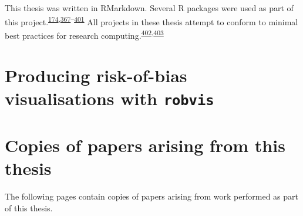 \documentclass[a4paper, twoside]{templates/ociamthesis}
\newcommand*{\bibtitle}{Bibliography}
\begin{document}
This thesis was written in RMarkdown. Several R packages were used as part of this project.\textsuperscript{\protect\hyperlink{ref-R-metafor}{174},\protect\hyperlink{ref-R-base}{367}--\protect\hyperlink{ref-sylly2018}{401}}
All projects in these thesis attempt to conform to minimal best practices for research computing.\textsuperscript{\protect\hyperlink{ref-wilson2014}{402},\protect\hyperlink{ref-wilson2017}{403}}

\hypertarget{appendix-robvis}{%
\section{\texorpdfstring{Producing risk-of-bias visualisations with \texttt{robvis}}{Producing risk-of-bias visualisations with robvis}}\label{appendix-robvis}}

\newpage

\hypertarget{published-papers}{%
\section{Copies of papers arising from this thesis}\label{published-papers}}

The following pages contain copies of papers arising from work performed as part of this thesis.








\setlength{\baselineskip}{0pt} %

{\renewcommand*\MakeUppercase[1]{#1}%
\printbibliography[heading=bibintoc,title={\bibtitle}]}
\end{document}
